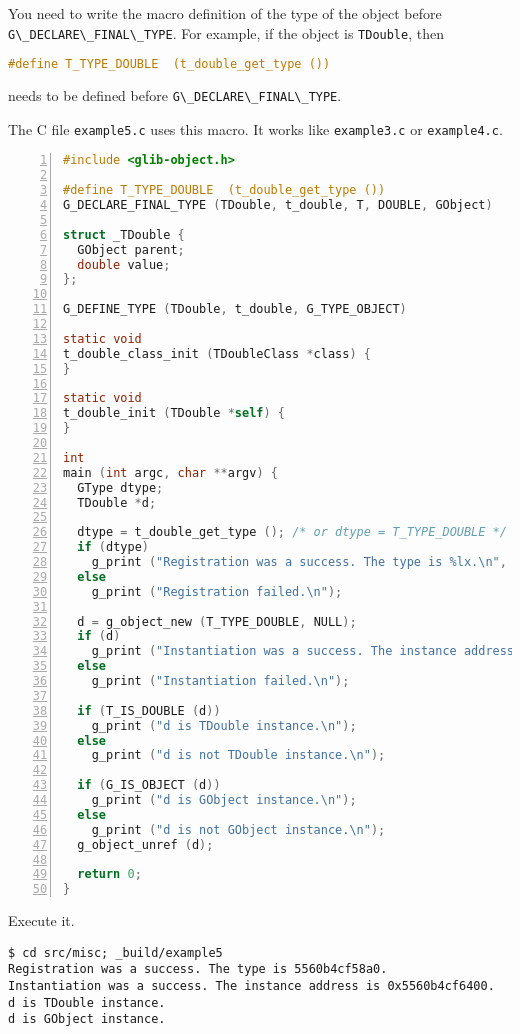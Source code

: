 You need to write the macro definition of the type of the object before
\passthrough{\lstinline!G\_DECLARE\_FINAL\_TYPE!}. For example, if the
object is \passthrough{\lstinline!TDouble!}, then

\begin{lstlisting}[language=C]
#define T_TYPE_DOUBLE  (t_double_get_type ())
\end{lstlisting}

needs to be defined before
\passthrough{\lstinline!G\_DECLARE\_FINAL\_TYPE!}.

The C file \passthrough{\lstinline!example5.c!} uses this macro. It
works like \passthrough{\lstinline!example3.c!} or
\passthrough{\lstinline!example4.c!}.

\begin{lstlisting}[language=C, numbers=left]
#include <glib-object.h>

#define T_TYPE_DOUBLE  (t_double_get_type ())
G_DECLARE_FINAL_TYPE (TDouble, t_double, T, DOUBLE, GObject)

struct _TDouble {
  GObject parent;
  double value;
};

G_DEFINE_TYPE (TDouble, t_double, G_TYPE_OBJECT)

static void
t_double_class_init (TDoubleClass *class) {
}

static void
t_double_init (TDouble *self) {
}

int
main (int argc, char **argv) {
  GType dtype;
  TDouble *d;

  dtype = t_double_get_type (); /* or dtype = T_TYPE_DOUBLE */
  if (dtype)
    g_print ("Registration was a success. The type is %lx.\n", dtype);
  else
    g_print ("Registration failed.\n");

  d = g_object_new (T_TYPE_DOUBLE, NULL);
  if (d)
    g_print ("Instantiation was a success. The instance address is %p.\n", d);
  else
    g_print ("Instantiation failed.\n");

  if (T_IS_DOUBLE (d))
    g_print ("d is TDouble instance.\n");
  else
    g_print ("d is not TDouble instance.\n");

  if (G_IS_OBJECT (d))
    g_print ("d is GObject instance.\n");
  else
    g_print ("d is not GObject instance.\n");
  g_object_unref (d);

  return 0;
}
\end{lstlisting}

Execute it.

\begin{lstlisting}
$ cd src/misc; _build/example5
Registration was a success. The type is 5560b4cf58a0.
Instantiation was a success. The instance address is 0x5560b4cf6400.
d is TDouble instance.
d is GObject instance.
\end{lstlisting}

